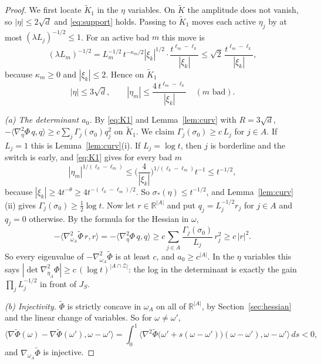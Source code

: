 \documentclass[11pt]{article}
\theoremstyle{remark}
\newcommand{\R}{\mathbb{R}}
\begin{document}
\begin{proof}
	We first locate $\tilde K_1$ in the $\eta$ variables. On $\tilde K$ the amplitude
	does not vanish, so $|\eta|\le2\sqrt d$ and \eqref{eq:support} holds. Passing to
	$\tilde K_1$ moves each active $\eta_j$ by at most $(\lambda L_j)^{-1/2}\le1$. For an
	active bad $m$ this move is
	\[
	(\lambda L_m)^{-1/2}=L_m^{-1/2}\,t^{-\kappa_m/2}|\xi_k|^{1/2}\cdot\frac{t^{\ell_m-\ell_k}}{|\xi_k|}
	\le\sqrt2\,\frac{t^{\ell_m-\ell_k}}{|\xi_k|},
	\]
	because $\kappa_m\ge0$ and $|\xi_k|\le2$. Hence on $\tilde K_1$
	\begin{equation}\label{eq:K1}
	|\eta|\le3\sqrt d,\qquad |\eta_m|\le\frac{4\,t^{\ell_m-\ell_k}}{|\xi_k|}\quad(m\text{ bad}).
	\end{equation}

	\emph{(a) The determinant $a_0$.} By \eqref{eq:K1} and Lemma~\ref{lem:curv} with
	$R=3\sqrt d$, $-\langle\nabla_\eta^2\Phi\,q,q\rangle\ge c\sum_j\Gamma_j(\sigma_0)q_j^2$
	on $\tilde K_1$. We claim $\Gamma_j(\sigma_0)\ge c\,L_j$ for $j\in A$. If $L_j=1$
	this is Lemma~\ref{lem:curv}(i). If $L_j=\log t$, then $j$ is borderline and the
	switch is early, and \eqref{eq:K1} gives for every bad $m$
	\[
	|\eta_m|^{1/(\ell_k-\ell_m)}\le\Big(\frac4{|\xi_k|}\Big)^{1/(\ell_k-\ell_m)}t^{-1}
	\le t^{-1/2},
	\]
	because $|\xi_k|\ge4t^{-\theta}\ge4t^{-(\ell_k-\ell_m)/2}$. So
	$\sigma_*(\eta)\le t^{-1/2}$, and Lemma~\ref{lem:curv}(ii) gives
	$\Gamma_j(\sigma_0)\ge\frac12\log t$. Now let $r\in\R^{|A|}$ and put
	$q_j=L_j^{-1/2}r_j$ for $j\in A$ and $q_j=0$ otherwise. By the formula for the
	Hessian in $\omega$,
	\[
	-\langle\nabla_{\omega_A}^2\tilde\Phi\,r,r\rangle=-\langle\nabla_\eta^2\Phi\,q,q\rangle
	\ge c\sum_{j\in A}\frac{\Gamma_j(\sigma_0)}{L_j}\,r_j^2\ge c\,|r|^2 .
	\]
	So every eigenvalue of $-\nabla_{\omega_A}^2\tilde\Phi$ is at least $c$, and
	$a_0\ge c^{|A|}$. In the $\eta$ variables this says
	$|\det\nabla_{\eta_A}^2\Phi|\ge c\,(\log t)^{|A\cap\mathcal Z|}$: the log in the
	determinant is exactly the gain $\prod_jL_j^{-1/2}$ in front of $J_S$.

	\emph{(b) Injectivity.} $\tilde\Phi$ is strictly concave in $\omega_A$ on all of
	$\R^{|A|}$, by Section~\ref{sec:hessian} and the linear change of variables. So for
	$\omega\ne\omega'$,
	\[
	\big\langle\nabla\tilde\Phi(\omega)-\nabla\tilde\Phi(\omega'),\omega-\omega'\big\rangle
	=\int_0^1\big\langle\nabla^2\tilde\Phi\big(\omega'+s(\omega-\omega')\big)(\omega-\omega'),\omega-\omega'\big\rangle\,ds<0 ,
	\]
	and $\nabla_{\omega_A}\tilde\Phi$ is injective.


\end{proof}
\end{document}

